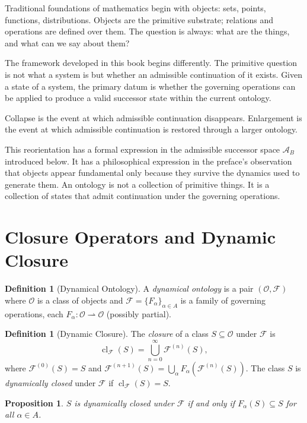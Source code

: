 \documentclass[12pt,oneside]{book}
\theoremstyle{plain}
\newtheorem{proposition}[theorem]{Proposition}
\theoremstyle{definition}
\newtheorem{definition}[theorem]{Definition}
\theoremstyle{remark}
\newcommand{\Oold}{\mathcal{O}}
\newcommand{\F}{\mathcal{F}}
\newcommand{\Admiss}{\mathcal{A}}
\newcommand{\cl}{\operatorname{cl}}
\begin{document}
Traditional foundations of mathematics begin with objects: sets, points,
functions, distributions. Objects are the primitive substrate; relations and
operations are defined over them. The question is always: what are the things,
and what can we say about them?

The framework developed in this book begins differently. The primitive question
is not what a system is but whether an admissible continuation of it exists.
Given a state of a system, the primary datum is whether the governing operations
can be applied to produce a valid successor state within the current ontology.

Collapse is the event at which admissible continuation disappears.
Enlargement is the event at which admissible continuation is restored through
a larger ontology.

This reorientation has a formal expression in the admissible successor space
$\Admiss_B$ introduced below. It has a philosophical expression in the preface's
observation that objects appear fundamental only because they survive the
dynamics used to generate them. An ontology is not a collection of primitive
things. It is a collection of states that admit continuation under the
governing operations.

\section{Closure Operators and Dynamic Closure}

\begin{definition}[Dynamical Ontology]
A \emph{dynamical ontology} is a pair $(\Oold, \F)$ where $\Oold$ is a
class of objects and $\F = \{F_\alpha\}_{\alpha \in A}$ is a family of
governing operations, each $F_\alpha : \Oold \rightharpoonup \Oold$
(possibly partial).
\end{definition}

\begin{definition}[Dynamic Closure]
The \emph{closure} of a class $S \subseteq \Oold$ under $\F$ is
\[
  \cl_\F(S) = \bigcup_{n=0}^{\infty} \F^{(n)}(S),
\]
where $\F^{(0)}(S) = S$ and
$\F^{(n+1)}(S) = \bigcup_\alpha F_\alpha(\F^{(n)}(S))$. The class $S$ is
\emph{dynamically closed} under $\F$ if $\cl_\F(S) = S$.
\end{definition}

\begin{proposition}
$S$ is dynamically closed under $\F$ if and only if $F_\alpha(S) \subseteq S$
for all $\alpha \in A$.
\end{proposition}
\end{document}
